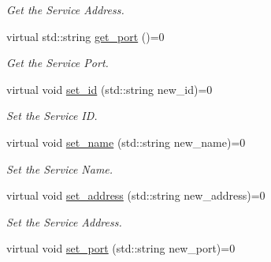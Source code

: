 \begin{DoxyCompactItemize}
\begin{DoxyCompactList}\small\item\em Get the Service Address. \end{DoxyCompactList}\item 
virtual std\+::string \hyperlink{classServiceInterface_a7c8a328711f7fb019a9f7dadcb897cb0}{get\+\_\+port} ()=0\hypertarget{classServiceInterface_a7c8a328711f7fb019a9f7dadcb897cb0}{}\label{classServiceInterface_a7c8a328711f7fb019a9f7dadcb897cb0}

\begin{DoxyCompactList}\small\item\em Get the Service Port. \end{DoxyCompactList}\item 
virtual void \hyperlink{classServiceInterface_aade793bb679fa00cd34194a3623c554a}{set\+\_\+id} (std\+::string new\+\_\+id)=0\hypertarget{classServiceInterface_aade793bb679fa00cd34194a3623c554a}{}\label{classServiceInterface_aade793bb679fa00cd34194a3623c554a}

\begin{DoxyCompactList}\small\item\em Set the Service ID. \end{DoxyCompactList}\item 
virtual void \hyperlink{classServiceInterface_ac9b2d1a785b665ef3c575f5877148511}{set\+\_\+name} (std\+::string new\+\_\+name)=0\hypertarget{classServiceInterface_ac9b2d1a785b665ef3c575f5877148511}{}\label{classServiceInterface_ac9b2d1a785b665ef3c575f5877148511}

\begin{DoxyCompactList}\small\item\em Set the Service Name. \end{DoxyCompactList}\item 
virtual void \hyperlink{classServiceInterface_a619fb75631f816d547d2ad3efeae2bf5}{set\+\_\+address} (std\+::string new\+\_\+address)=0\hypertarget{classServiceInterface_a619fb75631f816d547d2ad3efeae2bf5}{}\label{classServiceInterface_a619fb75631f816d547d2ad3efeae2bf5}

\begin{DoxyCompactList}\small\item\em Set the Service Address. \end{DoxyCompactList}\item 
virtual void \hyperlink{classServiceInterface_a2c9385fbc567949560dc7972e6a7059e}{set\+\_\+port} (std\+::string new\+\_\+port)=0\hypertarget{classServiceInterface_a2c9385fbc567949560dc7972e6a7059e}{}\label{classServiceInterface_a2c9385fbc567949560dc7972e6a7059e}


\end{DoxyCompactItemize}
